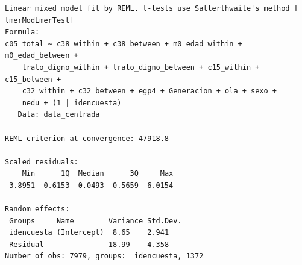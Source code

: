 \documentclass[
  spanish,
  a4paper,
  oneside]{scrbook}
\begin{document}
\begin{verbatim}
Linear mixed model fit by REML. t-tests use Satterthwaite's method [
lmerModLmerTest]
Formula: 
c05_total ~ c38_within + c38_between + m0_edad_within + m0_edad_between +  
    trato_digno_within + trato_digno_between + c15_within + c15_between +  
    c32_within + c32_between + egp4 + Generacion + ola + sexo +  
    nedu + (1 | idencuesta)
   Data: data_centrada

REML criterion at convergence: 47918.8

Scaled residuals: 
    Min      1Q  Median      3Q     Max 
-3.8951 -0.6153 -0.0493  0.5659  6.0154 

Random effects:
 Groups     Name        Variance Std.Dev.
 idencuesta (Intercept)  8.65    2.941   
 Residual               18.99    4.358   
Number of obs: 7979, groups:  idencuesta, 1372


\end{verbatim}
\end{document}
